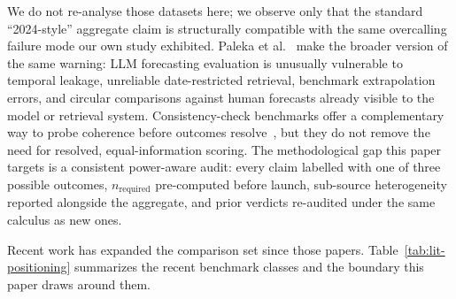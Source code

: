 \documentclass[11pt]{article}
\begin{document}
We do not re-analyse those datasets here; we observe only that the standard ``2024-style'' aggregate claim is structurally compatible with the same overcalling failure mode our own study exhibited. Paleka et al.~\cite{paleka2025pitfalls} make the broader version of the same warning: LLM forecasting evaluation is unusually vulnerable to temporal leakage, unreliable date-restricted retrieval, benchmark extrapolation errors, and circular comparisons against human forecasts already visible to the model or retrieval system. Consistency-check benchmarks offer a complementary way to probe coherence before outcomes resolve~\cite{paleka2024consistency}, but they do not remove the need for resolved, equal-information scoring. The methodological gap this paper targets is a consistent power-aware audit: every claim labelled with one of three possible outcomes, $n_{\mathrm{required}}$ pre-computed before launch, sub-source heterogeneity reported alongside the aggregate, and prior verdicts re-audited under the same calculus as new ones.

Recent work has expanded the comparison set since those papers. Table~\ref{tab:lit-positioning} summarizes the recent benchmark classes and the boundary this paper draws around them.
\end{document}
